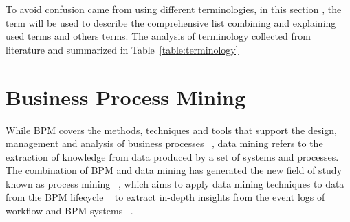 To avoid confusion came from using different terminologies, in this section , the term will be used to describe the comprehensive list  combining and explaining used terms and others terms. The analysis of terminology collected from literature and summarized in Table~\ref{table:terminology}






\section{Business Process Mining}

While BPM covers the methods, techniques and tools that support the design, management and analysis of business processes ~\cite{van2003workflow}, data mining refers to the extraction of knowledge from data produced by a set of systems and processes. The combination of BPM and data mining has generated the new field of study known as process mining ~\cite{van2011process}, which aims to apply data mining techniques to data from the BPM lifecycle ~\cite{song2008trace} to extract in-depth insights from the event logs of workflow and BPM systems ~\cite{van2003workflow}.



